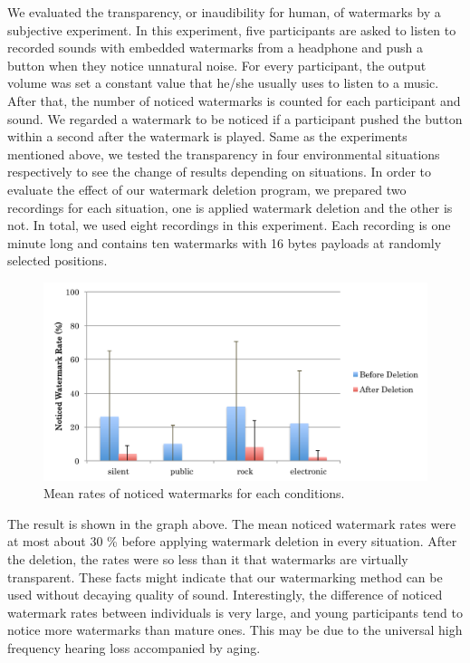 We evaluated the transparency, or inaudibility for human, of watermarks by a subjective experiment.
In this experiment, five participants are asked to listen to recorded sounds with embedded watermarks from a headphone and push a button when they notice unnatural noise.
For every participant, the output volume was set a constant value that he/she usually uses to listen to a music.
After that, the number of noticed watermarks is counted for each participant and sound.
We regarded a watermark to be noticed if a participant pushed the button within a second after the watermark is played.
Same as the experiments mentioned above, we tested the transparency in four environmental situations respectively to see the change of results depending on situations.
In order to evaluate the effect of our watermark deletion program, we prepared two recordings for each situation, one is applied watermark deletion and the other is not.
In total, we used eight recordings in this experiment.
Each recording is one minute long and contains ten watermarks with 16 bytes payloads at randomly selected positions.

\begin{figure}[htbp]
 \begin{center}
  \includegraphics[width=120mm]{evaluation_transparency.pdf}
 \end{center}
 \caption{Mean rates of noticed watermarks for each conditions.}
 \label{fig:eval_tran}
\end{figure}

The result is shown in the graph above.
The mean noticed watermark rates were at most about 30 \% before applying watermark deletion in every situation.
After the deletion, the rates were so less than it that watermarks are virtually transparent.
These facts might indicate that our watermarking method can be used without decaying quality of sound.
Interestingly, the difference of noticed watermark rates between individuals is very large, and young participants tend to notice more watermarks than mature ones.
This may be due to the universal high frequency hearing loss accompanied by aging.